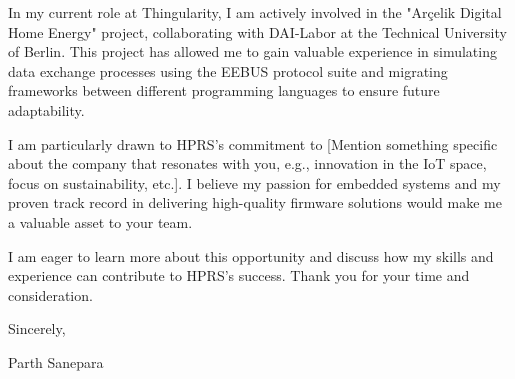 \documentclass[letterpaper,11pt]{article}
\newcommand{\CompanyName}{HPRS}
\newcommand{\CurrentCompany}{Thingularity}
\begin{document}
  In my current role at \CurrentCompany{}, I am actively involved in the "Arçelik Digital Home Energy" project, collaborating with 
  DAI-Labor at the Technical University of Berlin. This project has allowed me to gain valuable experience in simulating data 
  exchange processes using the EEBUS protocol suite and migrating frameworks between different programming languages to ensure 
  future adaptability. \\ \vspace{3pt}

  I am particularly drawn to \CompanyName{}'s commitment to [Mention something specific about the company that resonates with you, 
  e.g., innovation in the IoT space, focus on sustainability, etc.]. I believe my passion for embedded systems and my proven track 
  record in delivering high-quality firmware solutions would make me a valuable asset to your team. \\ \vspace{3pt}

  I am eager to learn more about this opportunity and discuss how my skills and experience can contribute to \CompanyName{}'s success. 
  Thank you for your time and consideration.

\vspace{3cm}


  Sincerely,

  Parth Sanepara



\end{document}
